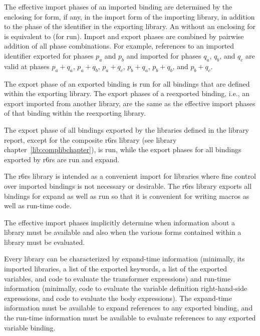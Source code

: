 The effective import phases of an imported binding are determined by the enclosing
{\cf for} form, if any, in the {\cf import} form of the importing
library, in addition to the phase of the identifier in the exporting library.
An  without an enclosing {\cf for} is equivalent to
{\cf (for  run)}.
Import and export phases are combined by pairwise addition of all phase
combinations.  For example, references to an imported identifier exported
for phases $p_a$ and $p_b$ and imported for phases $q_a$, $q_b$, and $q_c$
are valid at phases $p_a+q_a$, $p_a+q_b$, $p_a+q_c$, $p_b+q_a$, $p_b+q_b$,
and $p_b+q_c$.

The export phase of an exported binding is {\cf run} for all bindings
that are defined within the exporting library. The export phases of a
reexported binding, i.e., an export imported from another library, are the
same as the effective import phases of that binding within the reexporting
library.

The export phase of all bindings exported by the libraries defined in
the library report, except for the composite {\cf r6rs} library
(see library chapter~\ref{lib:complibchapter}), is {\cf run}, while
the export phases for all bindings exported by {\cf r6rs} are {\cf run}
and {\cf expand}.

\begin{rationale} 
The {\cf r6rs} library is intended as a convenient import for libraries where fine
control over imported bindings is not necessary or desirable. The {\cf r6rs} library
exports all bindings for {\cf expand} as well as {\cf run} so that it is convenient
for writing macros as well as run-time code.
\end{rationale}

The effective import phases implicitly determine when information about a
library must be available and also when the various forms contained within
a library must be evaluated.

Every library can be characterized by expand-time information (minimally,
its imported libraries, a list of the exported keywords, a list of the
exported variables, and code to evaluate the transformer expressions) and
run-time information (minimally, code to evaluate the variable definition
right-hand-side expressions, and code to evaluate the body expressions).
The expand-time information must be available to expand references to
any exported binding, and the run-time information must be available to
evaluate references to any exported variable binding.

